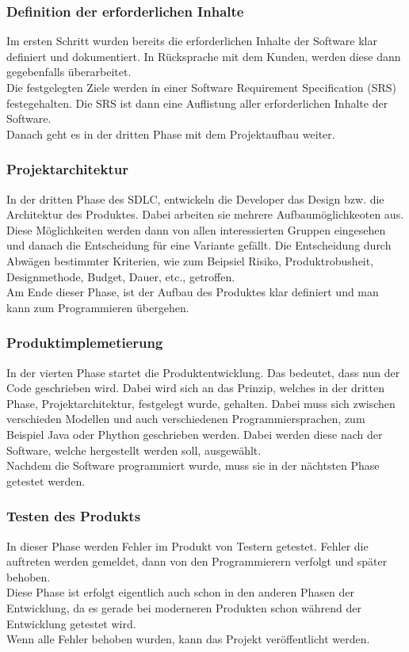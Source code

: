 \documentclass[a4paper, 10pt]{scrartcl}
\begin{document}
\subsubsection{Definition der erforderlichen Inhalte}
Im ersten Schritt wurden bereits die erforderlichen Inhalte der Software klar definiert und dokumentiert. In Rücksprache mit dem Kunden, werden diese dann gegebenfalls überarbeitet.\\
Die festgelegten Ziele werden in einer \glqq Software Requirement Specification (SRS)\grqq{} festegehalten. Die SRS ist dann eine Auflistung aller erforderlichen Inhalte der Software. \citep{stoica}\\
Danach geht es in der dritten Phase mit dem Projektaufbau weiter.
\subsubsection{Projektarchitektur}
In der dritten Phase des SDLC, entwickeln die Developer das Design bzw. die Architektur des Produktes. Dabei arbeiten sie mehrere Aufbaumöglichkeoten aus. Diese Möglichkeiten werden dann von allen interessierten Gruppen eingesehen und danach die Entscheidung für eine Variante gefällt. Die Entscheidung durch Abwägen bestimmter Kriterien, wie zum Beipsiel Risiko, Produktrobusheit, Designmethode, Budget, Dauer, etc., getroffen. \citep{stoica}\\
Am Ende dieser Phase, ist der Aufbau des Produktes klar definiert und man kann zum Programmieren übergehen.
\subsubsection{Produktimplemetierung}
In der vierten Phase startet die Produktentwicklung. Das bedeutet, dass nun der Code geschrieben wird. Dabei wird sich an das Prinzip, welches in der dritten Phase, Projektarchitektur, festgelegt wurde, gehalten. Dabei muss sich zwischen verschieden Modellen und auch verschiedenen Programmiersprachen, zum Beispiel Java oder Phython geschrieben werden. Dabei werden diese nach der Software, welche hergestellt werden soll, ausgewählt.\citep{stoica}\\
Nachdem die Software programmiert wurde, muss sie in der nächtsten Phase getestet werden.
\subsubsection{Testen des Produkts}
In dieser Phase werden Fehler im Produkt von Testern getestet. Fehler die auftreten werden gemeldet, dann von den Programmierern verfolgt und später behoben. \\ 
Diese Phase ist erfolgt eigentlich auch schon in den anderen Phasen der Entwicklung, da es gerade bei moderneren Produkten schon während der Entwicklung getestet wird. \citep{stoica}\\
Wenn alle Fehler behoben wurden, kann das Projekt veröffentlicht werden.
\end{document}

